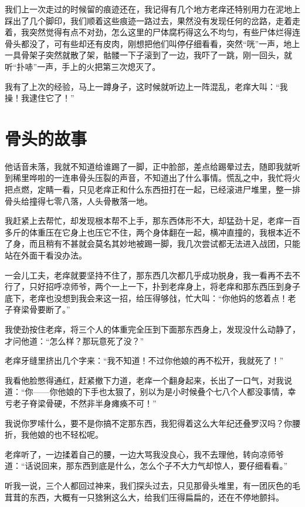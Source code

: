我们上一次走过的时候留的痕迹还在，我记得有几个地方老痒还特别用力在泥地上踩出了几个脚印，我们顺着这些痕迹一路过去，果然没有发现任何的岔路，走着走着，我突然觉得有点不对劲，怎么这里的尸体腐朽得这么不均匀，有些尸体烂得连骨头都没了，可有些却还有皮肉，刚想把他们叫停仔细看看，突然“咣”一声，地上一具骨架子突然就散了架，骷髅一下子滚到了一边，我吓了一跳，刚一回头，就听“扑哧”一声，手上的火把第三次熄灭了。

我有了上次的经验，马上一蹲身子，这时候就听边上一阵混乱，老痒大叫：“我操！我逮住它了！”

\chapter{骨头的故事}

他话音未落，我就不知道给谁踢了一脚，正中脸部，差点给踢晕过去，随即我就听到稀里哗啦的一连串骨头压裂的声音，不知道出了什么事情。慌乱之中，我忙将火把点燃，定睛一看，只见老痒正和什么东西扭打在一起，已经滚进尸堆里，整一排骨头给撞得七零八落，人头骨散落一地。

我赶紧上去帮忙，却发现根本帮不上手，那东西体形不大，却猛劲十足，老痒一百多斤的体重压在它身上也压它不住，两个身体翻在一起，横冲直撞的，我根本近不了身，而且稍有不甚就会莫名其妙地被踢一脚，我几次尝试都无法进入战团，只能站在外面干看没办法。

一会儿工夫，老痒就要坚持不住了，那东西几次都几乎成功脱身，我一看再不去不行了，只好招呼凉师爷，两个一上一下，扑到老痒身上，将老痒和那东西压到身子底下，老痒也没想到我会来这一招，给压得够戗，忙大叫：“你他妈的悠着点！老子脊梁骨要断了。”

我使劲按住老痒，将三个人的体重完全压到下面那东西身上，发现没什么动静了，才问他道：“怎么样？那玩意死了没？”

老痒牙缝里挤出几个字来：“我不知道！不过你他娘的再不松开，我就死了！”

我看他脸憋得通红，赶紧撤下力道，老痒一个翻身起来，长出了一口气，对我说道：“你——你他娘的下手也太狠了，别以为是小时候叠个七八个人都没事情，幸亏老子脊梁骨硬，不然非半身瘫痪不可！”

我说你罗嗦什么，要不是你搞不定那东西，我犯得着这么大年纪还叠罗汉吗？你腰折，我他娘的也不轻松呢。

老痒听了，一边揉着自己的腰，一边大骂我没良心，我不去理他，转向凉师爷道：“话说回来，那东西到底是什么，怎么个子不大力气却惊人，要仔细看看。”

听我一说，三个人都回过神来，我们探头过去，只见那骨头堆里，有一团灰色的毛茸茸的东西，大概有一只猞猁这么大，给我们压得扁扁的，还在不停地颤抖。

